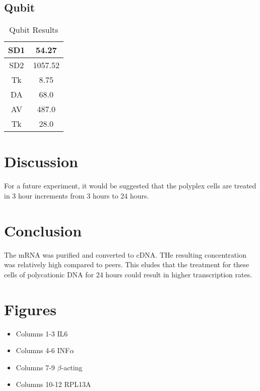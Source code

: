 \documentclass[journal, a4paper]{IEEEtran}
\begin{document}
  \subsection{Qubit}
    \begin{table}[!hbt]
      \begin{center}
      \caption{Qubit Results}
      \label{tab:simParameters}
      \begin{tabular}{|c|c|}
      \hline
      SD1 & 54.27 \\
      \hline
      SD2 & 1057.52 \\
      \hline
      Tk & 8.75 \\
      \hline
      DA & 68.0 \\
      \hline
      AV & 487.0 \\
      \hline
      Tk & 28.0 \\
      \hline
      \end{tabular}
      \end{center}
    \end{table}

\section{Discussion}

For a future experiment, it would be suggested that the polyplex cells are treated in 3 hour increments from 3 hours to 24 hours.

\section{Conclusion}
The mRNA was purified and converted to cDNA. THe resulting concentration was relatively high compared to peers. This eludes that the
treatment for these cells of polycationic DNA for 24 hours could result in higher transcription rates.

\section{Figures}

  \begin{itemize}
    \item Columns 1-3 IL6
    \item Columns 4-6 INF$\alpha$
    \item Columns 7-9 $\beta$-acting
    \item Columns 10-12 RPL13A
  \end{itemize}
\end{document}
